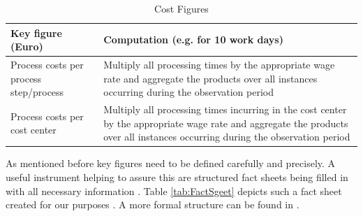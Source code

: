 \begin{table}[htbp]
	\centering
	\begin{tabular}{|p{3.0 cm } |p{10.0 cm }|}
		\hline
		\textbf{Key figure (Euro)} & \textbf{Computation (e.g. for 10 work days)}\\
		\hline
		\hline
		Process costs per process step/process & Multiply all processing times by the appropriate wage rate and aggregate the products over all instances occurring during the observation period\\
		\hline
		Process costs per cost center & Multiply all processing times incurring in the cost center by the appropriate wage rate and aggregate the products over all instances occurring during the observation period\\
		\hline
	\end{tabular}
\label{tab:CostFig}
\caption{Cost Figures}
\end{table}

As mentioned before key figures need to be defined carefully and precisely. A useful instrument helping to assure this are structured fact sheets being filled in with all necessary information \cite{book:KennzahlenIT}. Table \ref{tab:FactSgeet} depicts such a fact sheet created for our purposes \cite{book:MonitoringSubjekt}. A more formal structure can be found in \cite{article:ProcessPerfInd}.



